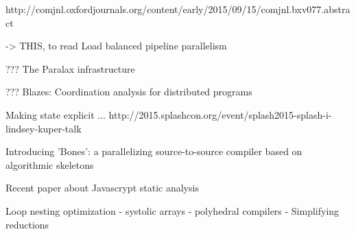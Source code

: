 http://comjnl.oxfordjournals.org/content/early/2015/09/15/comjnl.bxv077.abstract


-> THIS, to read
Load balanced pipeline parallelism \cite{Kamruzzaman2013}


??? The Paralax infrastructure \cite{Vandierendonck2010a}

??? Blazes: Coordination analysis for distributed programs \cite{Alvaro2014}

Making state explicit ... \cite{Fernandez2014a}
http://2015.splashcon.org/event/splash2015-splash-i-lindsey-kuper-talk


Introducing 'Bones': a parallelizing source-to-source compiler based on algorithmic skeletons \cite{Nugteren2012}


Recent paper about Javascrypt static analysis \cite{Chudnov2015}



Loop nesting optimization
- systolic arrays
- polyhedral compilers
- Simplifying reductions 


\cite{Mendis2015}